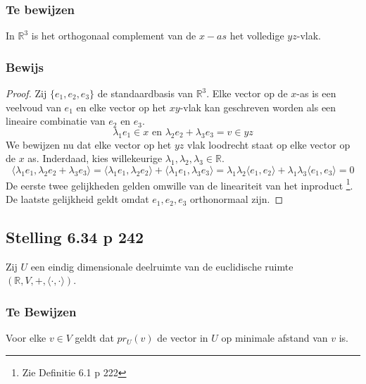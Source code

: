 \documentclass[lineaire_algebra_oplossingen.tex]{subfiles}
\begin{document}
\subsubsection*{Te bewijzen}
In $\mathbb{R}^3$ is het orthogonaal complement van de $x-as$ het volledige $yz$-vlak.

\subsubsection*{Bewijs}
\begin{proof}
Zij $\{e_1,e_2,e_3\}$ de standaardbasis van $\mathbb{R}^3$. Elke vector op de $x$-as is een veelvoud van $e_1$ en elke vector op het $xy$-vlak kan geschreven worden als een lineaire combinatie van $e_2$ en $e_3$.
\[
\lambda_1e_1 \in x \text{ en }\lambda_2e_2 + \lambda_3e_3 = v\in yz
\]
We bewijzen nu dat elke vector op het $yz$ vlak loodrecht staat op elke vector op de $x$ as.
Inderdaad, kies willekeurige $\lambda_1,\lambda_2,\lambda_3 \in \mathbb{R}$.
\[
\langle \lambda_1e_1 , \lambda_2e_2 + \lambda_3e_3 \rangle = \langle \lambda_1e_1 , \lambda_2e_2
\rangle + \langle \lambda_1e_1 , \lambda_3e_3 \rangle = \lambda_1\lambda_2\langle e_1 , e_2
\rangle + \lambda_1\lambda_3\langle e_1 , e_3 \rangle = 0
\]
De eerste twee gelijkheden gelden omwille van de lineariteit van het inproduct \footnote{Zie Definitie 6.1 p 222}.
De laatste gelijkheid geldt omdat $e_1,e_2,e_3$ orthonormaal zijn.
\end{proof}


\subsection{Stelling 6.34 p 242}
\label{6.34}
Zij $U$ een eindig dimensionale deelruimte van de euclidische ruimte $(\mathbb{R}, V,+, \langle \cdot,\cdot \rangle)$.

\subsubsection*{Te Bewijzen}
Voor elke $v\in V$ geldt dat $pr_U(v)$ de vector in $U$ op minimale afstand van $v$ is.
\end{document}
